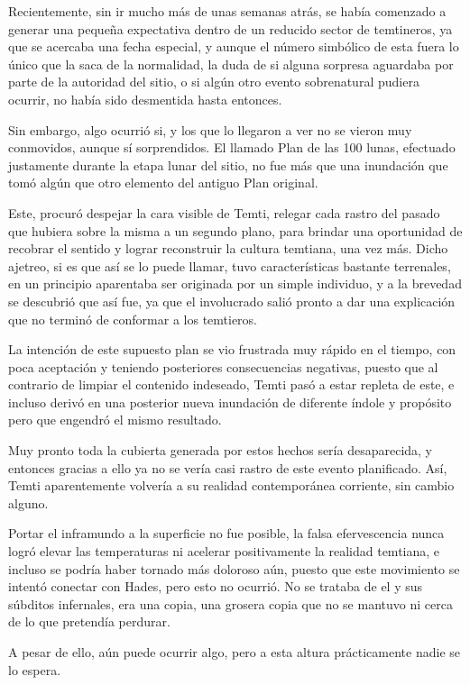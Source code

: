 \documentclass[
  spanish,
]{book}
\begin{document}
Recientemente, sin ir mucho más de unas semanas atrás, se había comenzado a generar una pequeña expectativa dentro de un reducido sector de temtineros, ya que se acercaba una fecha especial, y aunque el número simbólico de esta fuera lo único que la saca de la normalidad, la duda de si alguna sorpresa aguardaba por parte de la autoridad del sitio, o si algún otro evento sobrenatural pudiera ocurrir, no había sido desmentida hasta entonces.

Sin embargo, algo ocurrió si, y los que lo llegaron a ver no se vieron muy conmovidos, aunque sí sorprendidos. El llamado Plan de las 100 lunas, efectuado justamente durante la etapa lunar del sitio, no fue más que una inundación que tomó algún que otro elemento del antiguo Plan original.

Este, procuró despejar la cara visible de Temti, relegar cada rastro del pasado que hubiera sobre la misma a un segundo plano, para brindar una oportunidad de recobrar el sentido y lograr reconstruir la cultura temtiana, una vez más. Dicho ajetreo, si es que así se lo puede llamar, tuvo características bastante terrenales, en un principio aparentaba ser originada por un simple individuo, y a la brevedad se descubrió que así fue, ya que el involucrado salió pronto a dar una explicación que no terminó de conformar a los temtieros.

La intención de este supuesto plan se vio frustrada muy rápido en el tiempo, con poca aceptación y teniendo posteriores consecuencias negativas, puesto que al contrario de limpiar el contenido indeseado, Temti pasó a estar repleta de este, e incluso derivó en una posterior nueva inundación de diferente índole y propósito pero que engendró el mismo resultado.

Muy pronto toda la cubierta generada por estos hechos sería desaparecida, y entonces gracias a ello ya no se vería casi rastro de este evento planificado. Así, Temti aparentemente volvería a su realidad contemporánea corriente, sin cambio alguno.

Portar el inframundo a la superficie no fue posible, la falsa efervescencia nunca logró elevar las temperaturas ni acelerar positivamente la realidad temtiana, e incluso se podría haber tornado más doloroso aún, puesto que este movimiento se intentó conectar con Hades, pero esto no ocurrió. No se trataba de el y sus súbditos infernales, era una copia, una grosera copia que no se mantuvo ni cerca de lo que pretendía perdurar.

A pesar de ello, aún puede ocurrir algo, pero a esta altura prácticamente nadie se lo espera.
\end{document}

